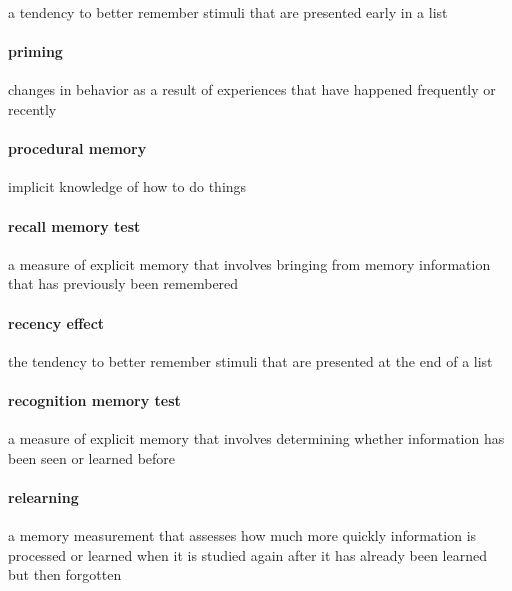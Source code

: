 \documentclass[
]{krantz}
\begin{document}
a tendency to better remember stimuli that are presented early in a list

\paragraph*{priming}\label{priming}

changes in behavior as a result of experiences that have happened frequently or recently

\paragraph*{procedural memory}\label{procedural-memory}

implicit knowledge of how to do things

\paragraph*{recall memory test}\label{recall-memory-test}

a measure of explicit memory that involves bringing from memory information that has previously been remembered

\paragraph*{recency effect}\label{recency-effect}

the tendency to better remember stimuli that are presented at the end of a list

\paragraph*{recognition memory test}\label{recognition-memory-test}

a measure of explicit memory that involves determining whether information has been seen or learned before

\paragraph*{relearning}\label{relearning}

a memory measurement that assesses how much more quickly information is processed or learned when it is studied again after it has already been learned but then forgotten
\end{document}
